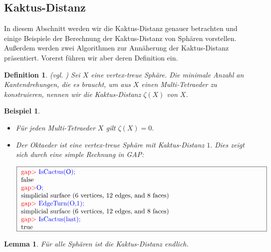 \documentclass[12pt,titlepage,twoside,cleardoublepage]{article}
\theoremstyle{nummermitklammern}
\newtheorem{lemma}[temp]{Lemma}
\newtheorem{bsp}[temp]{Beispiel}
\newtheorem{definition}[temp]{Definition}
\newtheorem{definition}[zahl]{Definition}
\newtheorem{lemma}[zahl]{Lemma}
\newtheorem{bsp}[zahl]{Beispiel}
\numberwithin{equation}{section}
\begin{document}
\subsection{Kaktus-Distanz}
In diesem Abschnitt werden wir die Kaktus-Distanz genauer betrachten und einige Beispiele der Berechnung der Kaktus-Distanz von Sphären vorstellen.
Außerdem werden zwei Algorithmen zur Annäherung der Kaktus-Distanz präsentiert.
Vorerst führen wir aber deren Definition ein.
\begin{definition}{\textsc{(}vgl. \textsc{\cite{simp})}}
Sei $X$ eine vertex-treue Sphäre. Die minimale Anzahl an Kantendrehungen, die es braucht, um aus $X$ einen Multi-Tetraeder zu  konstruieren, nennen wir die \emph{Kaktus-Distanz} $\zeta(X)$ von $X$.
\end{definition}
\begin{bsp}
\begin{itemize}
\item Für jeden Multi-Tetraeder $X$ gilt $\zeta(X)=0.$
\item Der Oktaeder ist eine vertex-treue Sphäre mit Kaktus-Distanz $1.$ Dies zeigt sich durch eine simple Rechnung in GAP:
\begin{center}
$\fbox{
\parbox{13cm}{
\textcolor{red}{gap$>$} \textcolor{blue}{IsCactus(O);}\\
false\\
\textcolor{red}{gap$>$}\textcolor{blue}{ O;}\\
simplicial surface (6 vertices, 12 edges, and 8 faces)\\
\textcolor{red}{gap$>$} \textcolor{blue}{EdgeTurn(O,1);}\\
simplicial surface (6 vertices, 12 edges, and 8 faces)\\
\textcolor{red}{gap$>$} \textcolor{blue}{IsCactus(last);}\\
true
}}$
\end{center}
\end{itemize}
\end{bsp}
\begin{lemma}
Für alle Sphären ist die Kaktus-Distanz endlich.
\end{lemma}
\end{document}
